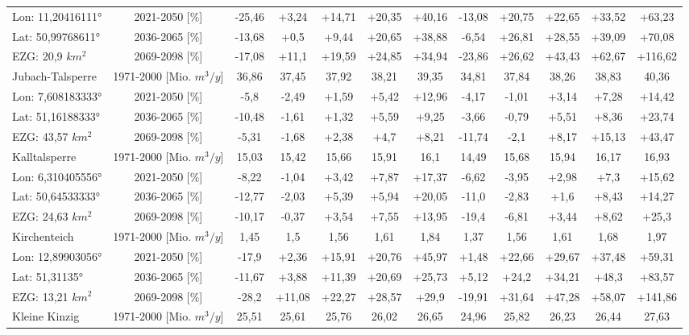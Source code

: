 \begin{longtable}{@{\extracolsep{\fill}}lc|ccccc||ccccc}
\cline{2-12} 
Lon: 11,20416111° & 2021-2050 [\%]  & -25,46 & +3,24 & +14,71 & +20,35 & +40,16 & -13,08 & +20,75 & +22,65 & +33,52 & +63,23\\ 
Lat: 50,99768611° & 2036-2065 [\%]  & -13,68 & +0,5 & +9,44 & +20,65 & +38,88 & -6,54 & +26,81 & +28,55 & +39,09 & +70,08\\ 
EZG: 20,9 $km^2$ & 2069-2098 [\%]  & -17,08 & +11,1 & +19,59 & +24,85 & +34,94 & -23,86 & +26,62 & +43,43 & +62,67 & +116,62\\ 
\hline 
Jubach-Talsperre & 1971-2000 [Mio. $m^3/y$]  & 36,86 & 37,45 & 37,92 & 38,21 & 39,35 & 34,81 & 37,84 & 38,26 & 38,83 & 40,36\\ 
\cline{2-12} 
Lon: 7,608183333° & 2021-2050 [\%]  & -5,8 & -2,49 & +1,59 & +5,42 & +12,96 & -4,17 & -1,01 & +3,14 & +7,28 & +14,42\\ 
Lat: 51,16188333° & 2036-2065 [\%]  & -10,48 & -1,61 & +1,32 & +5,59 & +9,25 & -3,66 & -0,79 & +5,51 & +8,36 & +23,74\\ 
EZG: 43,57 $km^2$ & 2069-2098 [\%]  & -5,31 & -1,68 & +2,38 & +4,7 & +8,21 & -11,74 & -2,1 & +8,17 & +15,13 & +43,47\\ 
\hline 
Kalltalsperre & 1971-2000 [Mio. $m^3/y$]  & 15,03 & 15,42 & 15,66 & 15,91 & 16,1 & 14,49 & 15,68 & 15,94 & 16,17 & 16,93\\ 
\cline{2-12} 
Lon: 6,310405556° & 2021-2050 [\%]  & -8,22 & -1,04 & +3,42 & +7,87 & +17,37 & -6,62 & -3,95 & +2,98 & +7,3 & +15,62\\ 
Lat: 50,64533333° & 2036-2065 [\%]  & -12,77 & -2,03 & +5,39 & +5,94 & +20,05 & -11,0 & -2,83 & +1,6 & +8,43 & +14,27\\ 
EZG: 24,63 $km^2$ & 2069-2098 [\%]  & -10,17 & -0,37 & +3,54 & +7,55 & +13,95 & -19,4 & -6,81 & +3,44 & +8,62 & +25,3\\ 
\hline 
Kirchenteich & 1971-2000 [Mio. $m^3/y$]  & 1,45 & 1,5 & 1,56 & 1,61 & 1,84 & 1,37 & 1,56 & 1,61 & 1,68 & 1,97\\ 
\cline{2-12} 
Lon: 12,89903056° & 2021-2050 [\%]  & -17,9 & +2,36 & +15,91 & +20,76 & +45,97 & +1,48 & +22,66 & +29,67 & +37,48 & +59,31\\ 
Lat: 51,31135° & 2036-2065 [\%]  & -11,67 & +3,88 & +11,39 & +20,69 & +25,73 & +5,12 & +24,2 & +34,21 & +48,3 & +83,57\\ 
EZG: 13,21 $km^2$ & 2069-2098 [\%]  & -28,2 & +11,08 & +22,27 & +28,57 & +29,9 & -19,91 & +31,64 & +47,28 & +58,07 & +141,86\\ 
\hline 
Kleine Kinzig & 1971-2000 [Mio. $m^3/y$]  & 25,51 & 25,61 & 25,76 & 26,02 & 26,65 & 24,96 & 25,82 & 26,23 & 26,44 & 27,63\\ 

\end{longtable}
